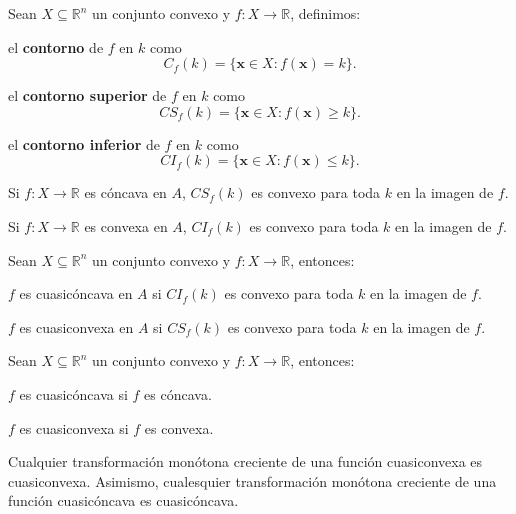 \documentclass[8pt,a4paper]{extarticle}
\begin{document}
\begin{multicols}{3}
\begin{boxdef}
	Sean $X \subseteq \mathbb{R}^n$ un conjunto convexo y $f : X \to \mathbb{R}$, definimos:
	\begin{bulletlist}
	\item el \textbf{contorno} de $f$ en $k$ como $$C_f(k) = \{\mathbf{x} \in X : f(\mathbf{x}) = k\}.$$
	\item el \textbf{contorno superior} de $f$ en $k$ como $$CS_f(k) = \{\mathbf{x} \in X : f(\mathbf{x}) \ge k\}.$$
	\item el \textbf{contorno inferior} de $f$ en $k$ como $$CI_f(k) = \{\mathbf{x} \in X : f(\mathbf{x}) \le k\}.$$
	\end{bulletlist}
\end{boxdef}

\begin{boxtheo}[]
	\begin{eqlist}
	\item Si $f : X \to \mathbb{R}$ es cóncava en $A$, $CS_f(k)$ es convexo para toda $k$ en la imagen de $f$.
	\item Si $f : X \to \mathbb{R}$ es convexa en $A$, $CI_f(k)$ es convexo para toda $k$ en la imagen de $f$.
	\end{eqlist}
\end{boxtheo}

\begin{boxtheo}[]
	Sean $X \subseteq \mathbb{R}^n$ un conjunto convexo y $f : X \to \mathbb{R}$, entonces:
	\begin{eqlist}
	\item $f$ es cuasicóncava en $A$ si $CI_f (k)$ es convexo para toda $k$ en la imagen de $f$.
	\item $f$ es cuasiconvexa en $A$ si $CS_f (k)$ es convexo para toda $k$ en la imagen de $f$.
	\end{eqlist}
\end{boxtheo}

\begin{boxtheo}[]
	Sean $X \subseteq \mathbb{R}^n$ un conjunto convexo y $f : X \to \mathbb{R}$, entonces:
	\begin{eqlist}
	\item $f$ es cuasicóncava si $f$ es cóncava.
	\item $f$ es cuasiconvexa si $f$ es convexa.
	\end{eqlist}
\end{boxtheo}

\begin{boxtheo}[]
	Cualquier transformación monótona creciente de una función cuasiconvexa es cuasiconvexa. Asimismo, cualesquier transformación monótona creciente de una función cuasicóncava es cuasicóncava.
\end{boxtheo}


\end{multicols}
\end{document}
